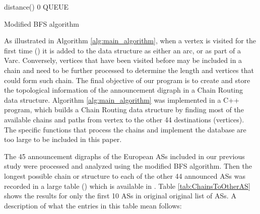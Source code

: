 \documentclass[5p,twocolumn]{elsarticle}
\begin{document}
\begin{algorithm}[!t]
	\SetAlgoNoLine
\BlankLine

	\BlankLine

	distance()  0\;
	QUEUE  \;
	\BlankLine


	\caption{Modified BFS algorithm}
	\label{alg:main_algorithm}
\end{algorithm}

As illustrated in Algorithm \ref{alg:main_algorithm}, when a vertex is visited for the first time () it is added to the data structure as either an arc, or as part of a Varc. Conversely, vertices that have been visited before may be included in a chain and need to be further processed to determine the length and vertices that could form such chain. The final objective of our program is to create and store the topological information of the announcement digraph in a Chain Routing data structure. Algorithm \ref{alg:main_algorithm} was implemented in a C++ program, which builds a Chain Routing data structure by finding most of the available chains and paths from vertex  to the other 44 destinations (vertices). The specific functions that process the chains and implement the database are too large to be included in this paper.



The 45 announcement digraphs of the European ASs included in our previous study \cite{Arjona-Villicana2009} were processed and analyzed using the modified BFS algorithm. Then the longest possible chain or structure to each of the other 44 announced ASs was recorded in a large table () which is available in \cite{Arjona-Villicana2010a}. Table \ref{tab:ChainsToOtherAS} shows the results for only the first 10 ASs in original original list of ASs. A description of what the entries in this table mean follows:
\end{document}
